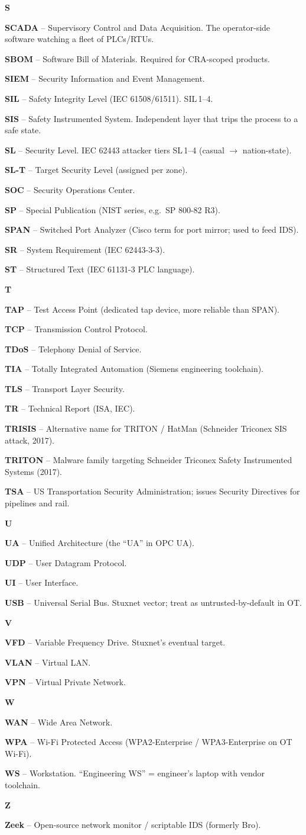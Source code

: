 \documentclass[10pt,a4paper,twocolumn]{article}
\newcommand{\ac}[2]{%
  \noindent\textcolor{slideBlue}{\textbf{#1}}\,\,--\,\,\small #2\par\vspace{0.6mm}%
}
\newcommand{\letterhead}[1]{%
  \par\vspace{1.5mm}%
  \noindent\colorbox{slidePanel}{\parbox{\dimexpr\columnwidth-2\fboxsep}{%
    \textcolor{slideBlue}{\textbf{\large #1}}}}\par\vspace{0.8mm}%
}
\begin{document}
\letterhead{S}
\ac{SCADA}{Supervisory Control and Data Acquisition. The operator-side software watching a fleet of PLCs/RTUs.}
\ac{SBOM}{Software Bill of Materials. Required for CRA-scoped products.}
\ac{SIEM}{Security Information and Event Management.}
\ac{SIL}{Safety Integrity Level (IEC 61508/61511). SIL\,1--4.}
\ac{SIS}{Safety Instrumented System. Independent layer that trips the process to a safe state.}
\ac{SL}{Security Level. IEC 62443 attacker tiers SL\,1--4 (casual $\to$ nation-state).}
\ac{SL-T}{Target Security Level (assigned per zone).}
\ac{SOC}{Security Operations Center.}
\ac{SP}{Special Publication (NIST series, e.g.\ SP 800-82 R3).}
\ac{SPAN}{Switched Port Analyzer (Cisco term for port mirror; used to feed IDS).}
\ac{SR}{System Requirement (IEC 62443-3-3).}
\ac{ST}{Structured Text (IEC 61131-3 PLC language).}

\letterhead{T}
\ac{TAP}{Test Access Point (dedicated tap device, more reliable than SPAN).}
\ac{TCP}{Transmission Control Protocol.}
\ac{TDoS}{Telephony Denial of Service.}
\ac{TIA}{Totally Integrated Automation (Siemens engineering toolchain).}
\ac{TLS}{Transport Layer Security.}
\ac{TR}{Technical Report (ISA, IEC).}
\ac{TRISIS}{Alternative name for TRITON / HatMan (Schneider Triconex SIS attack, 2017).}
\ac{TRITON}{Malware family targeting Schneider Triconex Safety Instrumented Systems (2017).}
\ac{TSA}{US Transportation Security Administration; issues Security Directives for pipelines and rail.}

\letterhead{U}
\ac{UA}{Unified Architecture (the ``UA'' in OPC UA).}
\ac{UDP}{User Datagram Protocol.}
\ac{UI}{User Interface.}
\ac{USB}{Universal Serial Bus. Stuxnet vector; treat as untrusted-by-default in OT.}

\letterhead{V}
\ac{VFD}{Variable Frequency Drive. Stuxnet's eventual target.}
\ac{VLAN}{Virtual LAN.}
\ac{VPN}{Virtual Private Network.}

\letterhead{W}
\ac{WAN}{Wide Area Network.}
\ac{WPA}{Wi-Fi Protected Access (WPA2-Enterprise / WPA3-Enterprise on OT Wi-Fi).}
\ac{WS}{Workstation. ``Engineering WS'' = engineer's laptop with vendor toolchain.}

\letterhead{Z}
\ac{Zeek}{Open-source network monitor / scriptable IDS (formerly Bro).}
\end{document}
